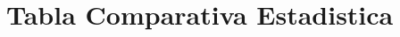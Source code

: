 \documentclass[11pt,a4paper]{article}
\begin{document}
\section*{Tabla Comparativa Estadistica}

\end{document}
